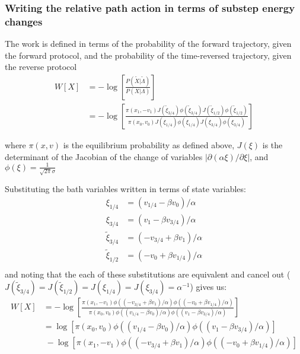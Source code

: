 \documentclass[11pt]{article}
\begin{document}
\subsubsection{Writing the relative path action in terms of substep energy changes}
The work is defined in terms of the probability of the forward trajectory, given the forward protocol, and the probability of the time-reversed trajectory, given the reverse protocol
$$\begin{aligned}
W[X] &= - \log \left[ \frac{P(\tilde{X} | \tilde{\Lambda})}{P(X | \Lambda)} \right]\\
&= - \log \left[ 
\frac{\pi(x_1, -v_1) J(\tilde{\xi}_{3/4})  \phi(\tilde{\xi}_{3/4}) J(\tilde{\xi}_{1/2})  \phi(\tilde{\xi}_{1/2}) }
{\pi(x_0, v_0) J(\xi_{1/4}) \phi(\xi_{1/4}) J(\xi_{3/4}) \phi(\xi_{3/4})  } \right]
\end{aligned}$$

where $\pi(x, v)$ is the equilibrium probability as defined above, $J(\xi)$ is the determinant of the Jacobian of the change of variables $| \partial (\alpha \xi) / \partial \xi |$, and $\phi(\xi) = \frac{1}{\sqrt{2 \pi} \sigma}$ 

Substituting the bath variables written in terms of state variables:
$$\begin{aligned}
\xi_{1/4} &= (v_{1/4} - \beta v_0) / \alpha\\
\xi_{3/4} &= (v_1 - \beta v_{3/4}) / \alpha\\
\tilde{\xi}_{3/4} &= (-v_{3/4} + \beta v_{1}) / \alpha\\
\tilde{\xi}_{1/2} &= (-v_{0} + \beta v_{1/4}) / \alpha\\
\end{aligned}$$
and noting that the each of these substitutions are equivalent and cancel out ($J(\tilde{\xi}_{3/4}) = J(\tilde{\xi}_{1/2}) =J(\xi_{1/4}) = J(\xi_{3/4}) = \alpha^{-1}$)
gives us:
$$\begin{aligned}
W[X] &= - \log \left[ 
\frac{\pi(x_1, -v_1) \phi((-v_{3/4} + \beta v_{1}) / \alpha)  \phi((-v_{0} + \beta v_{1/4}) / \alpha) }
{\pi(x_0, v_0) \phi((v_{1/4} - \beta v_0) / \alpha) \phi((v_1 - \beta v_{3/4}) / \alpha)  } \right]\\
&= \log
\left[
\pi(x_0, v_0) \phi((v_{1/4} - \beta v_0) / \alpha) \phi((v_1 - \beta v_{3/4}) / \alpha)
\right] \\
&\;- \log \left[
\pi(x_1, -v_1) \phi((-v_{3/4} + \beta v_{1}) / \alpha)  \phi((-v_{0} + \beta v_{1/4}) / \alpha)  \right]\\
\end{aligned}$$


\end{document}
